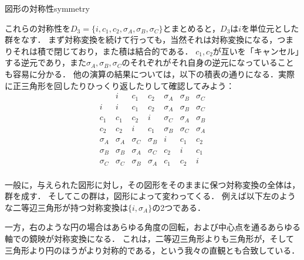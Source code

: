 \documentclass[11pt,a4paper, dvipdfmx]{jsarticle}
\begin{document}
\begin{rei}{図形の対称性}{symmetry}
\begin{center}
    \end{center}
    
    これらの対称性を$D_3 = \{i, c_1, c_2, \sigma_A, \sigma_B, \sigma_C\}$とまとめると，$D_3$は$i$を単位元とした群をなす．
    まず対称変換を続けて行っても，当然それは対称変換になる，つまりそれは積で閉じており，また積は結合的である．
    $c_1, c_2$が互いを「キャンセル」する逆元であり，また$\sigma_A, \sigma_B, \sigma_C$のそれぞれがそれ自身の逆元になっていることも容易に分かる．
    他の演算の結果については，以下の積表の通りになる．実際に正三角形を回したりひっくり返したりして確認してみよう：
    \[\begin{array}{c|cccccc}
        & i & c_1 & c_2 & \sigma_A & \sigma_B & \sigma_C \\ \hline
        i & i & c_1 & c_2 & \sigma_A & \sigma_B & \sigma_C \\ 
        c_1 & c_1 & c_2 & i &  \sigma_C & \sigma_A & \sigma_B  \\ 
        c_2 & c_2 & i & c_1 &  \sigma_B & \sigma_C & \sigma_A \\ 
        \sigma_A & \sigma_A & \sigma_C & \sigma_B &  i  &  c_1 & c_2 \\ 
        \sigma_B & \sigma_B & \sigma_A & \sigma_C &  c_2 &  i  & c_1\\ 
        \sigma_C & \sigma_C & \sigma_B & \sigma_A &  c_1 & c_2 &  i \\ 
 \end{array}\]
    
    一般に，与えられた図形に対し，その図形をそのままに保つ対称変換の全体は，群を成す．
    そしてこの群は，図形によって変わってくる．
    例えば以下左のような二等辺三角形が持つ対称変換は$\{i, \sigma_A\}$の2つである．
    \begin{center}
    \end{center}
    一方，右のような円の場合はあらゆる角度の回転，および中心点を通るあらゆる軸での鏡映が対称変換になる．
    これは，二等辺三角形よりも三角形が，そして三角形より円のほうがより対称的である，という我々の直観とも合致している．

\end{rei}
\end{document}
